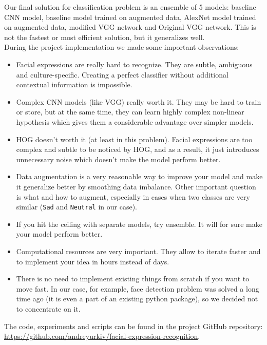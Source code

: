 Our final solution for classification problem is an ensemble of 5 models: baseline CNN model, baseline model trained on augmented data, AlexNet model trained on augmented data,  modified VGG network and Original VGG network. This is not the fastest or most efficient solution, but it generalizes well. \\

During the project implementation we made some important observations:

\begin{itemize}
	\item 
	Facial expressions are really hard to recognize. They are subtle, ambiguous and culture-specific. Creating a perfect classifier without additional contextual information is impossible.
	\item 
	Complex CNN models (like VGG) really worth it. They may be hard to train or store, but at the same time, they can learn highly complex non-linear hypothesis which gives them a considerable advantage over simpler models. 
	\item 
	HOG doesn't worth it (at least in this problem). Facial expressions are too complex and subtle to be noticed by HOG, and as a result, it just introduces unnecessary noise which doesn't make the model perform better.
	\item 
	Data augmentation is a very reasonable way to improve your model and make it generalize better by smoothing data imbalance. Other important question is what and how to augment, especially in cases when two classes are very similar (\texttt{Sad} and \texttt{Neutral} in our case).
	\item 
	If you hit the ceiling with separate models, try ensemble. It will for sure make your model perform better.
	\item 
	Computational resources are very important. They allow to iterate faster and to implement your idea in hours instead of days. 
	\item
	There is no need to implement existing things from scratch if you want to move fast. In our case, for example, face detection problem was solved a long time ago (it is even a part of an existing python package), so we decided not to concentrate on it.
\end{itemize}



The code, experiments and scripts can be found in the  project GitHub repository:\\ 

\url{https://github.com/andreyurkiv/facial-expression-recognition}.




